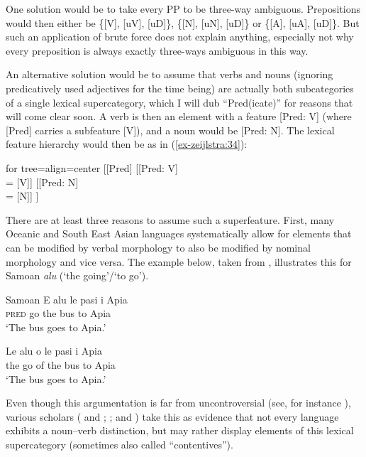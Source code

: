 \documentclass[output=paper
,modfonts
,nonflat]{langsci/langscibook}
\begin{document}
One solution would be to take every PP to be three-way ambiguous. Prepositions would then either be \{[V], [uV], [uD]\}, \{[N], [uN], [uD]\} or \{[A], [uA], [uD]\}. But such an application of brute force does not explain anything, especially not why every preposition is always exactly three-ways ambiguous in this way.

An alternative solution would be to assume that verbs and nouns (ignoring predicatively used adjectives for the time being) are actually both subcategories of a single lexical supercategory, which I will dub ``Pred(icate)'' for reasons that will come clear soon. A verb is then an element with a feature [Pred: V] (where [Pred] carries a subfeature [V]), and a noun would be [Pred: N]. The lexical feature hierarchy would then be as in (\ref{ex-zeijlstra:34}):

\ea \label{ex-zeijlstra:34}
			\begin{forest} for tree={align=center}	
				[{[}Pred{]}
				[{[}Pred: V{]}\\ {=} {[}V{]}]
				[{[}Pred: N{]}\\ {=} {[}N{]}]
				] 
		\end{forest} \z
\noindent There are at least three reasons to assume such a superfeature. First, many Oceanic and South East Asian languages systematically allow for elements that can be modified by verbal morphology to also be modified by nominal morphology and vice versa. The example below, taken from \citet{Don_VanLier2013}, illustrates this for Samoan \textit{alu} (‘the going’\slash‘to go’).

\begin{exe}
\ex	Samoan 
	\xlist
	\ex
	\gll E alu le pasi i Apia \\
	\textsc{pred} go the bus to Apia\\
	\glt   `The bus goes to Apia.'     
	
	\ex
	\gll Le alu o le pasi i Apia \\
	the  go of the bus  to Apia\\
	\glt   `The bus goes to Apia.'     
	\endxlist
	\end{exe}
Even though this argumentation is far from uncontroversial (see, for instance \citealt{Croft2005}), various scholars (\citealt{Hengeveld1992, Hengeveld2005} and \citealt{Mosel_Hovdhaugen1992}; \citealt{Gil2013}; and \citealt{Zeijlstra2017}) take this as evidence that not every language exhibits a noun–verb distinction, but may rather display elements of this lexical supercategory (sometimes also called ``contentives'').
\end{document}
